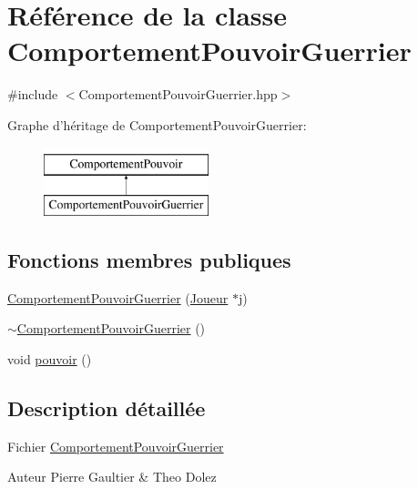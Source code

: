 \hypertarget{class_comportement_pouvoir_guerrier}{\section{\-Référence de la classe \-Comportement\-Pouvoir\-Guerrier}
\label{class_comportement_pouvoir_guerrier}
}


{\ttfamily \#include $<$\-Comportement\-Pouvoir\-Guerrier.\-hpp$>$}

\-Graphe d'héritage de \-Comportement\-Pouvoir\-Guerrier\-:\begin{figure}[H]
\begin{center}
\leavevmode
\includegraphics[height=2.000000cm]{class_comportement_pouvoir_guerrier}
\end{center}
\end{figure}
\subsection*{\-Fonctions membres publiques}
\begin{DoxyCompactItemize}
\item 
\hyperlink{class_comportement_pouvoir_guerrier_a5b4e19698e98c3d7a58a3859c6ca5118}{\-Comportement\-Pouvoir\-Guerrier} (\hyperlink{class_joueur}{\-Joueur} $\ast$j)
\item 
\hyperlink{class_comportement_pouvoir_guerrier_ae5113657a16d91283b311f18aa32b1e9}{$\sim$\-Comportement\-Pouvoir\-Guerrier} ()
\item 
void \hyperlink{class_comportement_pouvoir_guerrier_a2747bbff54360379e100aa62254a2a79}{pouvoir} ()
\end{DoxyCompactItemize}


\subsection{\-Description détaillée}
\-Fichier \hyperlink{class_comportement_pouvoir_guerrier}{\-Comportement\-Pouvoir\-Guerrier} \begin{DoxyAuthor}{\-Auteur}
\-Pierre \-Gaultier \& \-Theo \-Dolez 
\end{DoxyAuthor}


